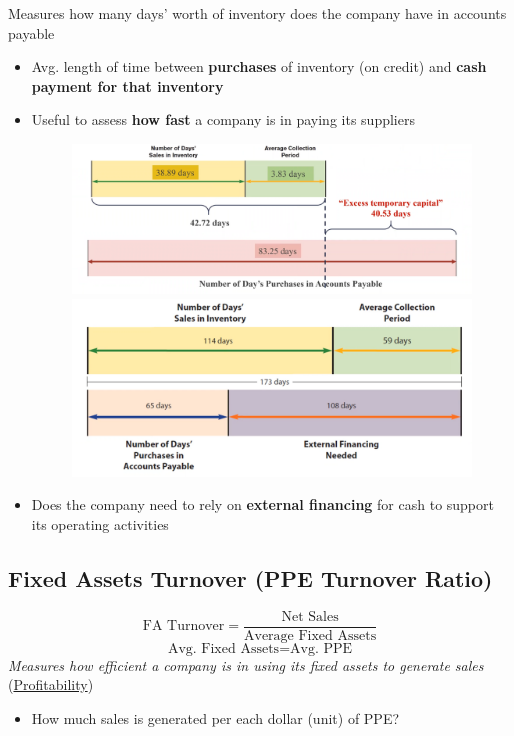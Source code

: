 \documentclass{article}
\begin{document}
\begin{multicols}{2}
Measures how many days' worth of inventory does the company have in accounts payable
\begin{itemize}
	\item Avg. length of time between \textbf{purchases} of inventory (on credit) and \textbf{cash payment for that inventory}
	\item Useful to assess \textbf{how fast} a company is in paying its suppliers
	\begin{figure}[H]
		\centering
		\includegraphics[width=\columnwidth]{image/operating_cycle.png}
		\includegraphics[width=\columnwidth]{image/caterpillar_opcycle.png}
	\end{figure}
    \item Does the company need to rely on \textbf{external financing} for cash to support its operating activities
\end{itemize}

\subsection{Fixed Assets Turnover (PPE Turnover Ratio)}
$$\text{FA Turnover} = \frac{\text{Net Sales}}{\text{Average Fixed Assets}}$$
$$\text{Avg. Fixed Assets} = \text{Avg. PPE}$$
\textit{Measures how efficient a company is in using its fixed assets to generate sales} (\underline{Profitability})
\begin{itemize}
	\item How much sales is generated per each dollar (unit) of PPE?
\end{itemize}


\end{multicols}
\end{document}

